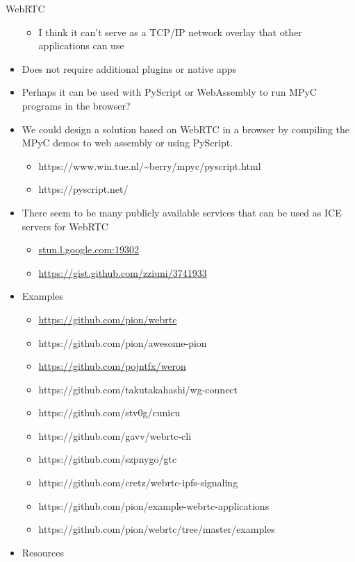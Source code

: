 \begin{block}{WebRTC}
\begin{itemize}
  \begin{itemize}
  \tightlist
  \item
    I think it can't serve as a TCP/IP network overlay that other applications can use
  \end{itemize}
\item
  Does not require additional plugins or native apps
\item
  Perhaps it can be used with PyScript or WebAssembly to run MPyC programs in the browser?
\item
  We could design a solution based on WebRTC in a browser by compiling the MPyC demos to web assembly or using PyScript.

  \begin{itemize}
  \tightlist
  \item
    https://www.win.tue.nl/\textasciitilde berry/mpyc/pyscript.html
  \item
    https://pyscript.net/
  \end{itemize}
\item
  There seem to be many publicly available services that can be used as ICE servers for WebRTC

  \begin{itemize}
  \tightlist
  \item
    \href{http://stun.l.google.com:19302/}{stun.l.google.com:19302}
  \item
    \url{https://gist.github.com/zziuni/3741933}
  \end{itemize}
\item
  Examples

  \begin{itemize}
  \tightlist
  \item
    \url{https://github.com/pion/webrtc}
  \item
    https://github.com/pion/awesome-pion
  \item
    \url{https://github.com/pojntfx/weron}
  \item
    https://github.com/takutakahashi/wg-connect
  \item
    https://github.com/stv0g/cunicu
  \item
    https://github.com/gavv/webrtc-cli
  \item
    https://github.com/szpnygo/gtc
  \item
    https://github.com/cretz/webrtc-ipfs-signaling
  \item
    https://github.com/pion/example-webrtc-applications
  \item
    https://github.com/pion/webrtc/tree/master/examples
  \end{itemize}
\item
  Resources


\end{itemize}
\end{block}
